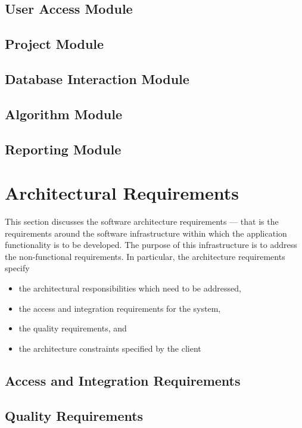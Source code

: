 \documentclass[hidelinks, 12pt, oneside]{article}
\begin{document}
\subsection{User Access Module}

\subsection{Project Module}

\subsection{Database Interaction Module}

\subsection{Algorithm Module}

\subsection{Reporting Module}

\section{Architectural Requirements}
This section discusses the software architecture requirements — that is the requirements around the
software infrastructure within which the application functionality is to be developed. The purpose
of this infrastructure is to address the non-functional requirements. In particular, the architecture
requirements specify
\begin{itemize}
	\item the architectural responsibilities which need to be addressed,
	\item the access and integration requirements for the system,
	\item the quality requirements, and
	\item the architecture constraints specified by the client
\end{itemize}
\subsection{Access and Integration Requirements}

\subsection{Quality Requirements}

\end{document}
